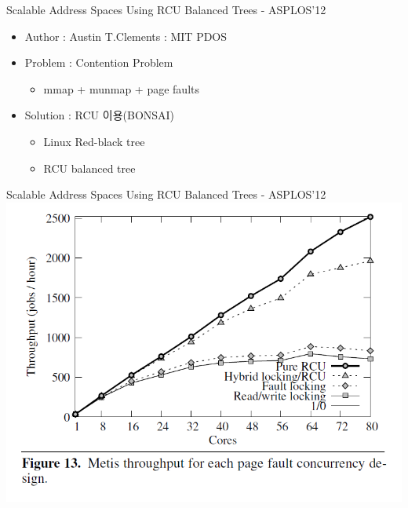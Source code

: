 \documentclass[english]{beamer} %
\begin{document}
\begin{frame}{Scalable Address Spaces Using RCU Balanced Trees - ASPLOS’12} 
    \begin{itemize}
    \item Author : Austin T.Clements : MIT PDOS
    \item Problem : Contention Problem
        \begin{itemize}
        \item mmap + munmap + page faults 
        \end{itemize}
    \item Solution : RCU 이용(BONSAI)
        \begin{itemize}
        \item Linux Red-black tree
        \item RCU balanced tree 
        \end{itemize}
    \end{itemize}
\end{frame}

\begin{frame}{Scalable Address Spaces Using RCU Balanced Trees - ASPLOS’12} 
\includegraphics[width=\textwidth,height=0.8\textheight,
keepaspectratio]{bonsai2}
\end{frame}
\end{document}
